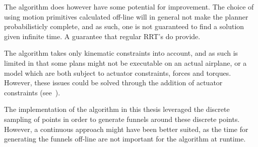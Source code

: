The algorithm does however have some potential for improvement. The choice of
using motion primitives calculated off-line will in general not make the planner
probabilisticly complete, and as such, one is not guaranteed to find a solution
given infinite time. A guarantee that regular \ac{RRT}'s do provide.

The algorithm takes only kinematic constraints into account, and as such is
limited in that some plans might not be executable on an actual airplane, or a
model which are both subject to actuator constraints, forces and torques.
However, these issues could be solved through the addition of actuator
constraints (see~\cite[sec.4.3.3]{majumdarFunnelLibrariesRealtime2017}).

The implementation of the algorithm in this thesis leveraged the discrete
sampling of points in order to generate funnels around these discrete points.
However, a continuous approach might have been better suited, as the time for
generating the funnels off-line are not important for the algorithm at runtime.


